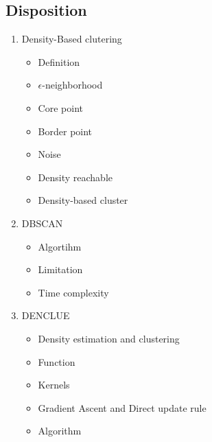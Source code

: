 \documentclass[a4, english]{article}
\begin{document}
\subsection{Disposition}
\begin{enumerate}
	\item Density-Based clutering 
  \begin{itemize}
    \item Definition
  	\item $\epsilon$-neighborhood
    \item Core point
    \item Border point
    \item Noise
    \item Density reachable
    \item Density-based cluster
  \end{itemize}
  \item DBSCAN
  \begin{itemize}
  	\item Algortihm
    \item Limitation
    \item Time complexity
  \end{itemize}
  \item DENCLUE
  \begin{itemize}
  	\item Density estimation and clustering
    \item Function
    \item Kernels
    \item Gradient Ascent and Direct update rule
    \item Algorithm
  \end{itemize}
\end{enumerate}
\newpage
\end{document}
